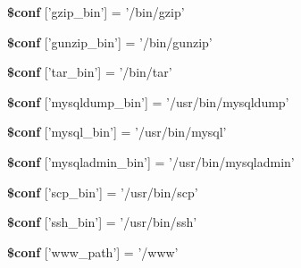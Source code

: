 \begin{DoxyCompactItemize}
\item 
\hypertarget{config__default_8inc_8php_afc5b593d67cc9249d40a786139b9faeb}{
{\bfseries \$conf} \mbox{[}'gzip\_\-bin'\mbox{]} = '/bin/gzip'}
\label{config__default_8inc_8php_afc5b593d67cc9249d40a786139b9faeb}

\item 
\hypertarget{config__default_8inc_8php_a8f7e36594f214d89df162140d9d6774e}{
{\bfseries \$conf} \mbox{[}'gunzip\_\-bin'\mbox{]} = '/bin/gunzip'}
\label{config__default_8inc_8php_a8f7e36594f214d89df162140d9d6774e}

\item 
\hypertarget{config__default_8inc_8php_ae5e1c83638827009961c3ca92fe944a8}{
{\bfseries \$conf} \mbox{[}'tar\_\-bin'\mbox{]} = '/bin/tar'}
\label{config__default_8inc_8php_ae5e1c83638827009961c3ca92fe944a8}

\item 
\hypertarget{config__default_8inc_8php_a85a5582fd1d0f5c3c54dfab06d3de80d}{
{\bfseries \$conf} \mbox{[}'mysqldump\_\-bin'\mbox{]} = '/usr/bin/mysqldump'}
\label{config__default_8inc_8php_a85a5582fd1d0f5c3c54dfab06d3de80d}

\item 
\hypertarget{config__default_8inc_8php_a290dcd111bf85b36b60e684c11cfa566}{
{\bfseries \$conf} \mbox{[}'mysql\_\-bin'\mbox{]} = '/usr/bin/mysql'}
\label{config__default_8inc_8php_a290dcd111bf85b36b60e684c11cfa566}

\item 
\hypertarget{config__default_8inc_8php_a16233aaef26da172b3187696aa93d277}{
{\bfseries \$conf} \mbox{[}'mysqladmin\_\-bin'\mbox{]} = '/usr/bin/mysqladmin'}
\label{config__default_8inc_8php_a16233aaef26da172b3187696aa93d277}

\item 
\hypertarget{config__default_8inc_8php_a320d9544a1f143f63c84dd561a8efe88}{
{\bfseries \$conf} \mbox{[}'scp\_\-bin'\mbox{]} = '/usr/bin/scp'}
\label{config__default_8inc_8php_a320d9544a1f143f63c84dd561a8efe88}

\item 
\hypertarget{config__default_8inc_8php_a8d45ad5f9d739b598664d2c5db91a792}{
{\bfseries \$conf} \mbox{[}'ssh\_\-bin'\mbox{]} = '/usr/bin/ssh'}
\label{config__default_8inc_8php_a8d45ad5f9d739b598664d2c5db91a792}

\item 
\hypertarget{config__default_8inc_8php_a0ad642e58034e7f28792a52158913a10}{
{\bfseries \$conf} \mbox{[}'www\_\-path'\mbox{]} = '/www'}
\label{config__default_8inc_8php_a0ad642e58034e7f28792a52158913a10}


\end{DoxyCompactItemize}
